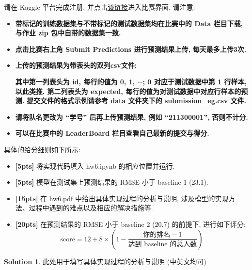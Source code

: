 \documentclass[a4paper,UTF8]{article}
\numberwithin{equation}{section}
\numberwithin{equation}{section}
\theoremstyle{definition}
\newtheorem*{solution}{Solution}
\begin{document}
请在 Kaggle 平台完成注册, 并点击\href{https://www.kaggle.com/t/3292cd87cf7f4ec8af0889617d410af8}{该链接}进入比赛界面. 请注意:

\begin{itemize}
    \item \textbf{带标记的训练数据集与不带标记的测试数据集均在比赛中的 Data 栏目下载, 与作业 zip 包中自带的数据集一致.}
    \item \textbf{点击比赛右上角 Submit Predictions 进行预测结果上传, }{\color{red} \textbf{每天最多上传3次.}}
    \item \textbf{上传的预测结果为带表头的双列csv文件; }
    
    {\color{red} \textbf{其中第一列表头为 id, 每行的值为 0, 1, $\cdots$; 0 对应于测试数据中第 1 行样本, 以此类推. 第二列表头为 expected, 每行的值为对测试数据中对应行样本的预测.} } \textbf{提交文件的格式示例请参考 data 文件夹下的 submission\_eg.csv 文件.}
    \item \textbf{请将队名更改为 “学号” 后再上传预测结果, 例如 “211300001”, }{\color{red} \textbf{否则不计分.}} 
    \item \textbf{可以在比赛中的 LeaderBoard 栏目查看自己最新的提交与得分.}
\end{itemize}







具体的给分细则如下所示:
\begin{itemize}
    \item \textbf{[5pts]} 将实现代码填入 hw6.ipynb 的相应位置并运行.
    \item \textbf{[5pts]} 模型在测试集上预测结果的 RMSE 小于 baseline 1 (23.1).
    \item \textbf{[15pts]} 在 hw6.pdf 中给出具体实现过程的分析与说明, 涉及模型的实现方法、过程中遇到的难点以及相应的解决措施等.
    \item \textbf{[20pts]} 在预测结果的 RMSE 小于 baseline 2 (20.7) 的前提下, 进行如下评分:
    \[\text{score} = 12  + 8\times \left(1-\frac{\text{你的排名}-1}{\text{达到 baseline 的总人数}}\right)\]
\end{itemize}

\begin{solution}
	此处用于填写具体实现过程的分析与说明 (中英文均可)
\end{solution}
\end{document}
